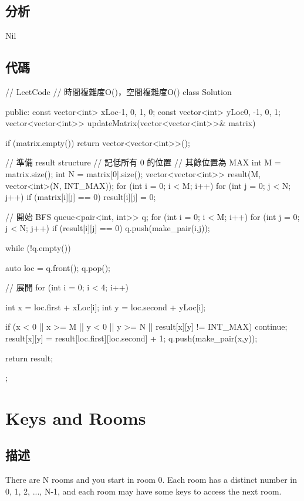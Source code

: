 \subsection{分析}
Nil

\subsection{代碼}
\begin{Code}
// LeetCode
// 時間複雜度O()，空間複雜度O()
class Solution {
public:
    const vector<int> xLoc{-1, 0, 1, 0};
    const vector<int> yLoc{0, -1, 0, 1};
    vector<vector<int>> updateMatrix(vector<vector<int>>& matrix) {
        if (matrix.empty()) return vector<vector<int>>();

        // 準備 result structure
        // 記低所有 0 的位置
        // 其餘位置為 MAX
        int M = matrix.size();
        int N = matrix[0].size();
        vector<vector<int>> result(M, vector<int>(N, INT_MAX));
        for (int i = 0; i < M; i++)
        {
            for (int j = 0; j < N; j++)
            {
                if (matrix[i][j] == 0)
                    result[i][j] = 0;
            }
        }

        // 開始 BFS
        queue<pair<int, int>> q;
        for (int i = 0; i < M; i++)
        {
            for (int j = 0; j < N; j++)
            {
                if (result[i][j] == 0)
                    q.push(make_pair(i,j));
            }
        }

        while (!q.empty())
        {
            auto loc = q.front();
            q.pop();

            // 展開
            for (int i = 0; i < 4; i++)
            {
                int x = loc.first + xLoc[i];
                int y = loc.second + yLoc[i];

                if (x < 0 || x >= M || y < 0 || y >= N || result[x][y] != INT_MAX)
                   continue;
                result[x][y] = result[loc.first][loc.second] + 1;
                q.push(make_pair(x,y));
            }
        }

        return result;
    }
};
\end{Code}


\section{Keys and Rooms}
\label{sec:keys-and-rooms}

\subsection{描述}
There are N rooms and you start in room 0.  Each room has a distinct number in 0, 1, 2, ..., N-1, and each room may have some keys to access the next room. 

